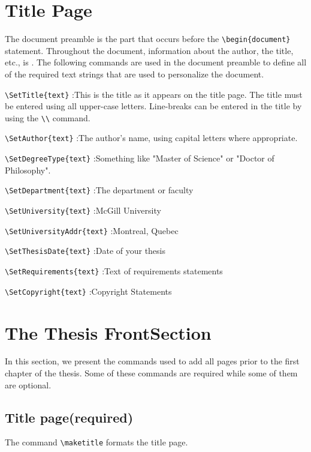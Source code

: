 \documentclass[12pt,Bold,letterpaper,TexShade]{mcgilletdclass}
\begin{document}
\chapter{Title Page}
The document preamble is the part that occurs before the \verb=\begin{document}=
statement. Throughout the document, information about the author,
the title, etc., is . The following commands are used in
the document preamble to define all of the required text strings that
are used to personalize the document.
\begin{BulletList}
	\item{\verb=\SetTitle{text}= :This is the title as it appears on the 
title page. The title must be entered using
all upper-case letters. Line-breaks can be entered in the title by
using the \verb=\\= command.}
	\item{\verb=\SetAuthor{text}= :The author's name, using capital letters 
where appropriate.}
	\item{\verb=\SetDegreeType{text}= :Something like "Master of Science" or 
"Doctor of Philosophy".}
	\item{\verb=\SetDepartment{text}= :The department or faculty }
	\item{\verb=\SetUniversity{text}= :McGill University }
	\item{\verb=\SetUniversityAddr{text}= :Montreal, Quebec}
	\item{\verb=\SetThesisDate{text}= :Date of your thesis}%
	\item{\verb=\SetRequirements{text}= :Text of requirements statements }%
	\item{\verb=\SetCopyright{text}= :Copyright Statements}%
\end{BulletList}


\chapter{The Thesis FrontSection}
In this section, we present the commands used to add all pages prior to
the first chapter of the thesis. Some of these commands are required
while some of them are optional.
\section{Title page(required)}
The command \verb=\maketitle= formats the title page. 
\end{document}
